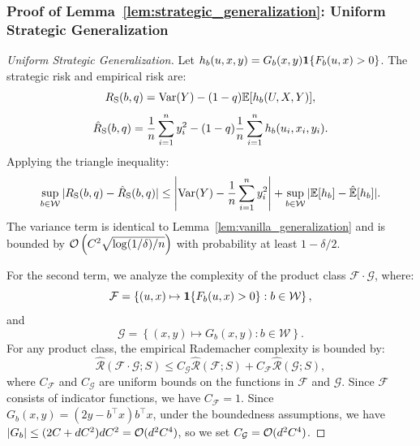 \subsubsection*{Proof of Lemma~\ref{lem:strategic_generalization}: Uniform Strategic Generalization}
\label{app:proof_strategic_generalization}
\begin{proof}[Uniform Strategic Generalization]
Let $h_b(u, x, y) = G_b(x, y)\mathbf{1}\{F_b(u, x) > 0\}$. The strategic risk and empirical risk are:
\begin{equation}
    R_{\mathrm{S}}(b, q) = \mathrm{Var}(Y) - (1 - q)\mathbb{E}[h_b(U, X, Y)],
\end{equation}
\begin{equation}
    \hat{R}_{\mathrm{S}}(b, q) = \frac{1}{n}\sum_{i=1}^n y_i^2 - (1 - q)\frac{1}{n}\sum_{i=1}^n h_b(u_i, x_i, y_i).
\end{equation}
Applying the triangle inequality:
\begin{equation}
    \sup_{b \in \mathcal{W}} |R_{\mathrm{S}}(b, q) - \hat{R}_{\mathrm{S}}(b, q)| \le \left| \mathrm{Var}(Y) - \frac{1}{n}\sum_{i=1}^n y_i^2 \right| + \sup_{b \in \mathcal{W}} |\mathbb{E}[h_b] - \hat{\mathbb{E}}[h_b]|.
\end{equation}
The variance term is identical to Lemma~\ref{lem:vanilla_generalization} and is bounded by $\mathcal{O}\left( C^2\sqrt{\log(1/\delta)/n} \right)$ with probability at least $1 - \delta/2$.

For the second term, we analyze the complexity of the product class $\mathcal{F} \cdot \mathcal{G}$, where:
\begin{equation}
    \mathcal{F} = \left\{ (u, x) \mapsto \mathbf{1}\{F_b(u, x) > 0\} : b \in \mathcal{W} \right\},
\end{equation}
and
\begin{equation}
    \mathcal{G} = \left\{ (x, y) \mapsto G_b(x, y) : b \in \mathcal{W} \right\}.
\end{equation}
For any product class, the empirical Rademacher complexity is bounded by:
\begin{equation}
    \hat{\mathcal{R}}(\mathcal{F} \cdot \mathcal{G}; S) \le C_{\mathcal{G}}\hat{\mathcal{R}}(\mathcal{F}; S) + C_{\mathcal{F}}\hat{\mathcal{R}}(\mathcal{G}; S),
\end{equation}
where $C_{\mathcal{F}}$ and $C_{\mathcal{G}}$ are uniform bounds on the functions in $\mathcal{F}$ and $\mathcal{G}$. 
Since $\mathcal{F}$ consists of indicator functions, we have $C_{\mathcal{F}} = 1$. Since $G_b(x, y) = (2y - b^\top x)b^\top x$, under the boundedness assumptions, we have $|G_b| \le (2C + dC^2)dC^2 = \mathcal{O}(d^2 C^4)$, so we set $C_{\mathcal{G}} = \mathcal{O}(d^2 C^4)$.


\end{proof}
